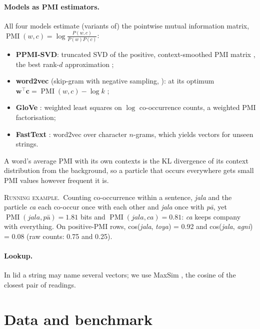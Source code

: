 \documentclass[11pt]{article}
\newcommand{\vk}[1]{\textsf{#1}}
\newcommand{\PMI}{\operatorname{PMI}}
\newcommand{\ex}{\par\smallskip\noindent\textsc{Running example.}~}
\begin{document}
\paragraph{Models as PMI estimators.} All four models estimate (variants of)
the pointwise mutual information matrix,
$\PMI(w,c)=\log\frac{P(w,c)}{P(w)P(c)}$:
\begin{itemize}
\item \textbf{PPMI-SVD}: truncated SVD of the positive, context-smoothed
  PMI matrix \citep{levy2015improving}, the best rank-$d$ approximation
  \citep{eckart1936approximation};
\item \textbf{word2vec} (skip-gram with negative sampling,
  \citealp{mikolov2013distributed}): at its optimum
  $\mathbf{w}^\top\mathbf{c}=\PMI(w,c)-\log k$ \citep{levy2014neural};
\item \textbf{GloVe} \citep{pennington2014glove}: weighted least squares on
  $\log$ co-occurrence counts, a weighted PMI factorisation;
\item \textbf{FastText} \citep{bojanowski2017enriching}: word2vec over
  character $n$-grams, which yields vectors for unseen strings.
\end{itemize}
A word's average PMI with its own contexts is the KL divergence of its
context distribution from the background, so a particle that occurs
everywhere gets small PMI values however frequent it is.

\ex Counting co-occurrence within a sentence, \emph{jala} and the particle
\emph{ca} each co-occur once with each other and \emph{jala} once with
\emph{pā}, yet $\PMI(\textit{jala},\textit{pā})=1.81$ bits and
$\PMI(\textit{jala},\textit{ca})=0.81$: \emph{ca} keeps company with
everything. On positive-PMI rows, cos(\emph{jala}, \emph{toya}) = 0.92 and
cos(\emph{jala}, \emph{agni}) = 0.08 (raw counts: 0.75 and 0.25).

\paragraph{Lookup.} In \vk{lid} a string may name several vectors; we use
MaxSim \citep{reisinger2010multi}, the cosine of the closest pair of
readings.

\section{Data and benchmark}\label{sec:data}
\end{document}
